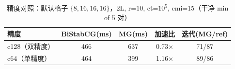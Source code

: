 \begin{table}[h]\centering
\begin{tabular}{lcccc}
\toprule
精度 & BiStabCG(ms) & MG(ms) & 加速比 & 迭代(MG/ref) \\
\midrule
c128（双精度） & 466 & 637 & 0.73$\times$ & 71/87 \\
c64（单精度） & 464 & 399 & 1.16$\times$ & 89/86 \\
\bottomrule
\end{tabular}
\caption{精度对照：默认格子 $\{8,16,16,16\}$，2L, r=10, ct=$10^5$, cmi=15（干净 min of 5 对）}
\end{table}
